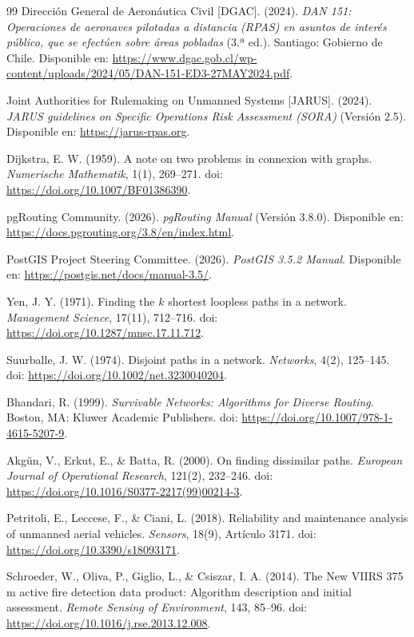 \documentclass[letterpaper,12pt]{article}
\begin{document}
\begin{thebibliography}{99}
 Dirección General de Aeronáutica Civil [DGAC]. (2024). \textit{DAN 151: Operaciones de aeronaves pilotadas a distancia (RPAS) en asuntos de interés público, que se efectúen sobre áreas pobladas} (3.ª ed.). Santiago: Gobierno de Chile. Disponible en: \url{https://www.dgac.gob.cl/wp-content/uploads/2024/05/DAN-151-ED3-27MAY2024.pdf}.

 Joint Authorities for Rulemaking on Unmanned Systems [JARUS]. (2024). \textit{JARUS guidelines on Specific Operations Risk Assessment (SORA)} (Versión 2.5). Disponible en: \url{https://jarus-rpas.org}.

 Dijkstra, E. W. (1959). A note on two problems in connexion with graphs. \textit{Numerische Mathematik}, 1(1), 269--271. doi: \url{https://doi.org/10.1007/BF01386390}.

 pgRouting Community. (2026). \textit{pgRouting Manual} (Versión 3.8.0). Disponible en: \url{https://docs.pgrouting.org/3.8/en/index.html}.

 PostGIS Project Steering Committee. (2026). \textit{PostGIS 3.5.2 Manual}. Disponible en: \url{https://postgis.net/docs/manual-3.5/}.

 Yen, J. Y. (1971). Finding the $k$ shortest loopless paths in a network. \textit{Management Science}, 17(11), 712--716. doi: \url{https://doi.org/10.1287/mnsc.17.11.712}.

 Suurballe, J. W. (1974). Disjoint paths in a network. \textit{Networks}, 4(2), 125--145. doi: \url{https://doi.org/10.1002/net.3230040204}.

 Bhandari, R. (1999). \textit{Survivable Networks: Algorithms for Diverse Routing}. Boston, MA: Kluwer Academic Publishers. doi: \url{https://doi.org/10.1007/978-1-4615-5207-9}.

 Akgün, V., Erkut, E., \& Batta, R. (2000). On finding dissimilar paths. \textit{European Journal of Operational Research}, 121(2), 232--246. doi: \url{https://doi.org/10.1016/S0377-2217(99)00214-3}.

 Petritoli, E., Leccese, F., \& Ciani, L. (2018). Reliability and maintenance analysis of unmanned aerial vehicles. \textit{Sensors}, 18(9), Artículo 3171. doi: \url{https://doi.org/10.3390/s18093171}.

 Schroeder, W., Oliva, P., Giglio, L., \& Csiszar, I. A. (2014). The New VIIRS 375 m active fire detection data product: Algorithm description and initial assessment. \textit{Remote Sensing of Environment}, 143, 85--96. doi: \url{https://doi.org/10.1016/j.rse.2013.12.008}.


\end{thebibliography}
\end{document}
